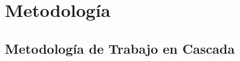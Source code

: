 \chapter{Metodología}
\label{C3}
\section{Metodolog\'ia de Trabajo en Cascada}
\label{sec:metodologia}
